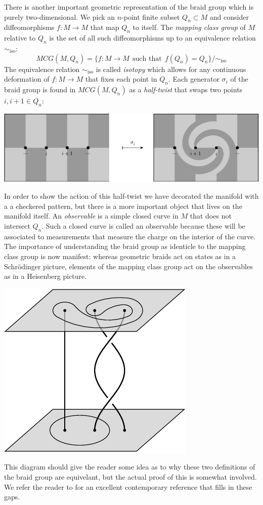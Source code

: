 \documentclass[aps, prl, letterpaper, twocolumn, superscriptaddress, notitlepage, 10pt]{revtex4-1}
\begin{document}
There is another important geometric representation of
the braid group which is purely two-dimensional.
We pick an $n$-point finite subset $Q_n \subset M$
and consider diffeomorphisms $f : M \to M$
that map $Q_n$ to itself.
The \emph{mapping class group} of $M$ relative to $Q_n$
is the set of all such diffeomorphisms up to an equivalence relation $\sim_{\mbox{iso}}$:
$$
    MCG(M, Q_n) = \{ f : M \to M \ \ \mbox{such that}\ \ f(Q_n)=Q_n \} / \sim_{\mbox{iso}}
$$
The equivalence relation $\sim_{\mbox{iso}}$ is called \emph{isotopy}
which allows for any continuous deformation of $f:M\to M$ that
fixes each point in $Q_n.$
Each generator $\sigma_i$ of the braid group is found in $MCG(M, Q_n)$
as a \emph{half-twist} that swaps two points $i, i+1 \in Q_n$:
\begin{center}
\includegraphics[]{pic-halftwist.pdf}
\end{center}
In order to show
the action of
this half-twist we have 
decorated the manifold with
a a checkered pattern,
but there is a more important
object that lives on the manifold
itself.
An \emph{observable} is a simple
closed curve in $M$ that does
not intersect $Q_n.$
Such a closed curve is called an
observable because these will be
associated to measurements
that measure the charge on the
interior of the curve.
The importance of understanding the
braid group as identicle to the mapping class group
is now manifest:
whereas geometric braids act on states
as in a Schr\"{o}dinger picture,
elements of the mapping class group
act on the observables as in
a Heisenberg picture.
\begin{center}
\includegraphics[]{pic-heisenberg.pdf}
\end{center}
This diagram should give the reader some idea as
to why these two definitions of the braid group are
equivelant, but the actual proof of this is somewhat involved.
We refer the reader to \cite{Kassel2010} for an excellent contemporary
reference that fills in these gaps.
\end{document}
